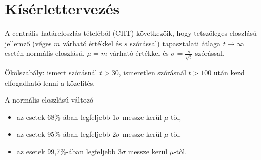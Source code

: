 \section{Kísérlettervezés}

A centrális határeloszlás tételéből (CHT) következőik, hogy tetszőleges eloszlású jellemző (véges $m$ várható értékkel és $s$ szórással) tapasztalati átlaga $t \rightarrow \infty$ esetén normális eloszlású, $\mu = m$ várható értékkel és $\sigma = \frac{s}{\sqrt{t}}$ szórással.

Ökölszabály: ismert szórásnál $t > 30$, ismeretlen szórásnál $t > 100$ után kezd elfogadható lenni a közelítés.

A normális eloszlású változó
\begin{itemize}
	\item az esetek 68\%-ában legfeljebb $1\sigma$ messze kerül $\mu$-től,
	\item az esetek 95\%-ában legfeljebb $2\sigma$ messze kerül $\mu$-től,
	\item az esetek 99,7\%-ában legfeljebb $3\sigma$ messze kerül $\mu$-től.
\end{itemize}

